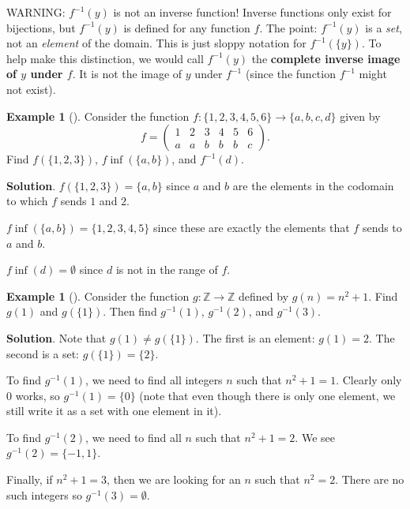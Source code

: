 \documentclass[10pt,]{book}
\newcommand{\terminology}[1]{\textbf{#1}}
\theoremstyle{plain}
\theoremstyle{definition}
\theoremstyle{definition}
\newtheorem{example}[theorem]{Example}
\theoremstyle{definition}
\theoremstyle{definition}
\numberwithin{equation}{chapter}
\def\Z{\mathbb Z}
\def\inv{^{-1}}
\newcommand{\amp}{&}
\begin{document}
\par
\hypertarget{p-1760}{}%
WARNING: \(f\inv(y)\) is not an inverse function! Inverse functions only exist for bijections, but \(f\inv(y)\) is defined for any function \(f\). The point: \(f\inv(y)\) is a \emph{set}, not an \emph{element} of the domain.  This is just sloppy notation for \(f\inv(\{y\})\).  To help make this distinction, we would call \(f\inv(y)\) the \terminology{complete inverse image of \(y\) under \(f\)}.  It is not the image of \(y\) under \(f\inv\) (since the function \(f\inv\) might not exist).%
\begin{example}[]\label{example-52}
\hypertarget{p-1761}{}%
Consider the function \(f:\{1,2,3,4,5,6\} \to \{a,b,c,d\}\) given by%
\begin{equation*}
f = \begin{pmatrix}1 \amp 2 \amp 3 \amp 4 \amp 5 \amp 6 \\ a \amp a \amp b \amp b \amp b \amp c\end{pmatrix}.
\end{equation*}
Find \(f(\{1,2,3\})\),  \(f\inf(\{a,b\})\), and \(f\inv(d)\).%
\par\smallskip%
\noindent\textbf{Solution}.\hypertarget{solution-147}{}\quad%
\hypertarget{p-1762}{}%
\(f(\{1,2,3\}) = \{a,b\}\) since \(a\) and \(b\) are the elements in the codomain to which \(f\) sends \(1\) and \(2\).%
\par
\hypertarget{p-1763}{}%
\(f\inf(\{a,b\}) = \{1,2,3,4,5\}\) since these are exactly the elements that \(f\) sends to \(a\) and \(b\).%
\par
\hypertarget{p-1764}{}%
\(f\inf(d) = \emptyset\) since \(d\) is not in the range of \(f\).%
\end{example}
\begin{example}[]\label{example-53}
\hypertarget{p-1765}{}%
Consider the function \(g:\Z \to \Z\) defined by \(g(n) = n^2 + 1\). Find \(g(1)\) and \(g(\{1\})\).  Then find \(g\inv(1)\), \(g\inv(2)\), and \(g\inv(3)\).%
\par\smallskip%
\noindent\textbf{Solution}.\hypertarget{solution-148}{}\quad%
\hypertarget{p-1766}{}%
Note that \(g(1) \ne g(\{1\})\).  The first is an element: \(g(1) = 2\).  The second is a set: \(g(\{1\}) = \{2\}\).%
\par
\hypertarget{p-1767}{}%
To find \(g\inv(1)\), we need to find all integers \(n\) such that \(n^2 + 1 = 1\). Clearly only 0 works, so \(g\inv(1) = \{0\}\) (note that even though there is only one element, we still write it as a set with one element in it).%
\par
\hypertarget{p-1768}{}%
To find \(g\inv(2)\), we need to find all \(n\) such that \(n^2 + 1 = 2\). We see \(g\inv(2) = \{-1,1\}\).%
\par
\hypertarget{p-1769}{}%
Finally, if \(n^2 + 1 = 3\), then we are looking for an \(n\) such that \(n^2 = 2\). There are no such integers so \(g\inv(3) = \emptyset\).%
\end{example}
\end{document}
